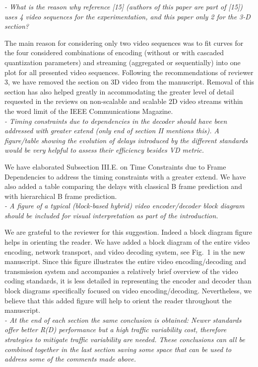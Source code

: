 \documentclass[11pt, draftclsnofoot, onecolumn]{IEEEtran}
\begin{document}
{{\noindent \textit{- What is the reason why reference [15] (authors
    of this paper are part of [15]) uses 4 video sequences for the
    experimentation, and this paper only 2 for the 3-D section?}

The main reason for considering only two video sequences was to fit
curves for the four considered combinations of encoding
(without or with cascaded quantization parameters) and streaming
(aggregated or sequentially) into one plot for all presented video
sequences.
Following the recommendations of reviewer 3, we have removed the
section on 3D video from the manuscript. Removal of this section
has also helped greatly in accommodating the greater level of detail
requested in the reviews on non-scalable and scalable 2D video streams within
the word limit of the IEEE Communications Magazine.\\

\noindent \textit{- Timing constraints due to dependencies in the
    decoder should have been addressed with greater extend (only end
    of section II mentions this). A figure/table showing the evolution
    of delays introduced by the different standards would be very
    helpful to assess their efficiency besides VD metric.}

We have elaborated Subsection III.E. on Time Constraints due to Frame
Dependencies to address the timing constraints with a greater extend.
We have also added a table comparing the delays with classical B frame
prediction and with hierarchical B frame prediction.\\


\noindent \textit{- A figure of a typical (block-based hybrid)
    video encoder/decoder block diagram should be included for visual
    interpretation as part of the introduction.}

We are grateful to the reviewer for this suggestion. Indeed a block diagram
figure helps in orienting the reader. We have added a block diagram
of the entire video encoding, network transport, and video decoding
system, see Fig.~1 in the new manuscript.
Since this figure illustrates the entire video encoding/decoding
and transmission system and accompanies a relatively brief overview
of the video coding standards, it is less detailed in representing the
encoder and decoder than block diagrams specifically focused on video
encoding/decoding. Nevertheless, we believe that this added figure will
help to orient the reader throughout the manuscript.\\


\noindent \textit{- At the end of each section the same conclusion
    is obtained: Newer standards offer better R(D) performance but a
    high traffic variability cost, therefore strategies to mitigate
    traffic variability are needed. These conclusions can all be
    combined together in the last section saving some space that can
    be used to address some of the comments made above.}

}}
\end{document}
